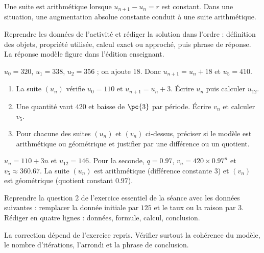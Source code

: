     \begin{summary}Une suite est arithmétique lorsque $u_{n+1}-u_n=r$ est constant. Dans une situation, une augmentation absolue constante conduit à une suite arithmétique.\end{summary}

    \begin{example}
    Reprendre les données de l'activité et rédiger la solution dans l'ordre : définition des objets, propriété utilisée, calcul exact ou approché, puis phrase de réponse. La réponse modèle figure dans l'édition enseignant.
    \end{example}
    \begin{solution}$u_0=320$, $u_1=338$, $u_2=356$ ; on ajoute $18$. Donc $u_{n+1}=u_n+18$ et $u_5=410$.\end{solution}

    \begin{exercise}[essentiel]
    \begin{enumerate}\item La suite $(u_n)$ vérifie $u_0=110$ et $u_{n+1}=u_n+3$. Écrire $u_n$ puis calculer $u_{12}$.\item Une quantité vaut $420$ et baisse de $\pc{3}$ par période. Écrire $v_n$ et calculer $v_5$.\item Pour chacune des suites $(u_n)$ et $(v_n)$ ci-dessus, préciser si le modèle est arithmétique ou géométrique et justifier par une différence ou un quotient.\end{enumerate}
    \end{exercise}
    \begin{solution}$u_n=110+3n$ et $u_{12}=146$. Pour la seconde, $q=\num{0,97}$, $v_n=420\times\num{0,97}^n$ et $v_5\approx\num{360,67}$. La suite $(u_n)$ est arithmétique (différence constante $3$) et $(v_n)$ est géométrique (quotient constant $\num{0,97}$).\end{solution}


    \begin{homework}Reprendre la question 2 de l'exercice essentiel de la séance avec les données suivantes : remplacer la donnée initiale par $125$ et le taux ou la raison par $3$. Rédiger en quatre lignes : données, formule, calcul, conclusion.\end{homework}
    \begin{solution}La correction dépend de l'exercice repris. Vérifier surtout la cohérence du modèle, le nombre d'itérations, l'arrondi et la phrase de conclusion.\end{solution}

